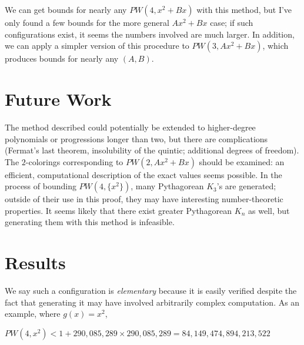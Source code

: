 \documentclass[a4paper]{amsproc}
\theoremstyle{plain}
\begin{document}
We can get bounds for nearly any $PW(4,x^2+Bx)$ with this method,
but I've only found a few bounds for the more general $Ax^2+Bx$ case;
if such configurations exist, it seems the numbers involved are much larger.
In addition, we can apply a simpler version of this procedure to $PW(3,Ax^2+Bx)$,
which produces bounds for nearly any $(A, B)$.

\section{Future Work}

The method described could potentially be extended to higher-degree polynomials or progressions longer than two, but there are complications
(Fermat's last theorem, insolubility of the quintic; additional degrees of freedom).
The $2$-colorings corresponding to $PW(2,Ax^2+Bx)$ should be examined: an efficient, computational description of the exact values seems possible.
In the process of bounding $PW(4, \{x^2\})$, many Pythagorean $K_3$'s are generated;
outside of their use in this proof, they may have interesting number-theoretic properties.
It seems likely that there exist greater Pythagorean $K_n$ as well, but generating them with this method is infeasible.

\section{Results}

We say such a configuration is \textit{elementary} because it is easily verified despite the fact that generating it may have involved arbitrarily complex computation.
As an example, where $g(x)=x^2$,

$ PW(4, x^2) < 1+290{,}085{,}289\times 290{,}085{,}289 = 84{,}149{,}474{,}894{,}213{,}522$
\end{document}
